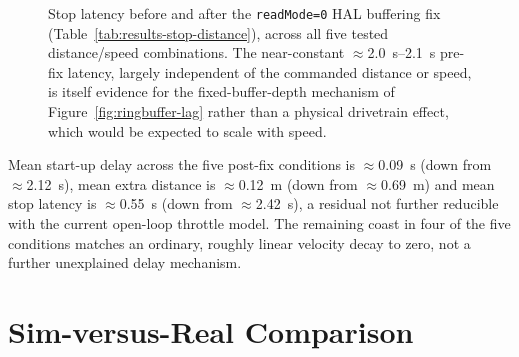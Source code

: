 \begin{figure}[htbp]
  \centering
  \caption[Stop latency before/after the \texttt{readMode=0} fix]{Stop latency before and after the \texttt{readMode=0} HAL
    buffering fix (Table~\ref{tab:results-stop-distance}), across all
    five tested distance/speed combinations. The near-constant
    $\approx$\SI{2.0}{\second}--\SI{2.1}{\second} pre-fix latency,
    largely independent of the commanded distance or speed, is itself
    evidence for the fixed-buffer-depth mechanism of
    Figure~\ref{fig:ringbuffer-lag} rather than a physical drivetrain
    effect, which would be expected to scale with speed.}
  \label{fig:stop-latency-chart}
\end{figure}

Mean start-up delay across the five post-fix conditions is
$\approx$\SI{0.09}{\second} (down from $\approx$\SI{2.12}{\second}),
mean extra distance is $\approx$\SI{0.12}{\meter} (down from
$\approx$\SI{0.69}{\meter}) and mean stop latency is
$\approx$\SI{0.55}{\second} (down from $\approx$\SI{2.42}{\second}), a
residual not further reducible with the current open-loop throttle
model. The remaining coast in four of the five conditions matches an
ordinary, roughly linear velocity decay to zero, not a further
unexplained delay mechanism.

\section{Sim-versus-Real Comparison}
\label{sec:results-sim-vs-real}

